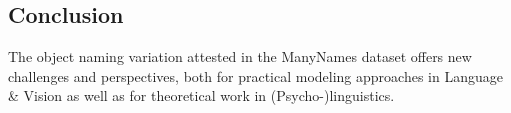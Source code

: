 \subsection{Conclusion}
\label{sec:conclusion}

The object naming variation attested in the ManyNames dataset offers new challenges and perspectives, both for practical modeling approaches in Language \& Vision as well as for theoretical work in (Psycho-)linguistics.

